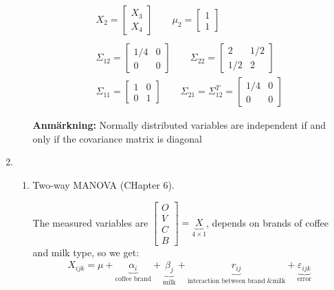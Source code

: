 \begin{enumerate}[label=\arabic*.,leftmargin=*]
\begin{enumerate}[label=\alph*),leftmargin=*]
\begin{equation*}
\begin{gathered}
            X_2 = \begin{bmatrix}X_3\\X_4\end{bmatrix}\qquad \mu_2 = \begin{bmatrix}1\\1\end{bmatrix}\\\\
            \Sigma_{12} = \begin{bmatrix}1/4&0\\0&0\end{bmatrix}\qquad \Sigma_{22} = \begin{bmatrix}2&1/2\\1/2&2\end{bmatrix}\\
            \Sigma_{11} = \begin{bmatrix}1&0\\0&1\end{bmatrix}\qquad\Sigma_{21}  = \Sigma_{12}^T = \begin{bmatrix}1/4&0\\0&0\end{bmatrix}
          \end{gathered}
        \end{equation*}
        \par\bigskip
        \noindent\textbf{Anmärkning:} Normally distributed variables are independent if and only if the covariance matrix is diagonal
    \end{enumerate}
    \item\par\bigskip
    \begin{enumerate}[label=\alph*),leftmargin=*]
      \item Two-way MANOVA (CHapter 6).
        \par\bigskip
        \noindent The measured variables are $\begin{bmatrix}O\\V\\C\\B\end{bmatrix} = \underbrace{X}_{4\times1}$, depends on brands of coffee and milk type, so we get:
        \begin{equation*}
          \begin{gathered}
            X_{ijk} = \mu+\underbrace{\alpha_i}_{\text{coffee brand}}+\underbrace{\beta_j}_{\text{milk}}+\underbrace{r_{ij}}_{\text{interaction between brand \& milk}}+\underbrace{\varepsilon_{ijk}}_{\text{error}}

\end{gathered}
\end{equation*}
\end{enumerate}
\end{enumerate}
